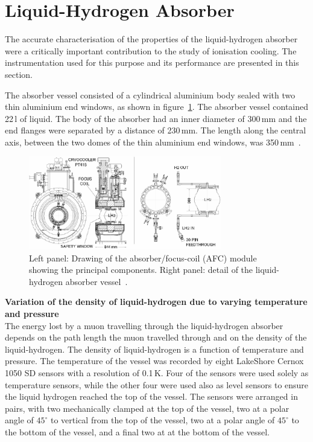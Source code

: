 \graphicspath{{07-Absorber/Figures/}}

\section{Liquid-Hydrogen Absorber}
\label{Sect:Absorber}

The accurate characterisation of the properties of the liquid-hydrogen
absorber were a critically important contribution to the study of
ionisation cooling.
The instrumentation used for this purpose and its performance are
presented in this section.

The absorber vessel consisted of a cylindrical aluminium body sealed
with two thin aluminium end windows, as shown in
figure~\ref{Fig:AbsorberVessel:Diag}.
The absorber vessel contained 22\,l of liquid.
The body of the absorber had an inner diameter of 300\,mm and the end
flanges were separated by a distance of 230\,mm.  
The length along the central axis, between the two domes of the thin
aluminium end windows, was 350\,mm~\cite{1748-0221-13-09-T09008}. \\
\begin{figure}
  \begin{center}
    \includegraphics[width=0.75\textwidth]{AFC-drwng.pdf}
  \end{center}
  \caption{
    Left panel: Drawing of the absorber/focus-coil (AFC) module
    showing the principal components.
    Right panel: detail of the liquid-hydrogen absorber vessel~\cite{1748-0221-13-09-T09008}.
  }
  \label{Fig:AbsorberVessel:Diag}
\end{figure}

\noindent\textbf{Variation of the density of liquid-hydrogen due to
    varying temperature and pressure} \\
\noindent
The energy lost by a muon travelling through the liquid-hydrogen
absorber depends on the path length the muon travelled through and on
the density of the liquid-hydrogen. The density of liquid-hydrogen is
a function of temperature and pressure.  
The temperature of the vessel was recorded by eight LakeShore Cernox
1050 SD sensors with a resolution of 0.1\,K. 
Four of the sensors were used solely as temperature sensors, while the
other four were used also as level sensors to ensure the
liquid hydrogen reached the top of the vessel. 
The sensors were arranged in pairs, with two mechanically clamped at
the top of the vessel, two at a polar angle of ${45}^{\circ}$ to
vertical from the top of the vessel, two at a polar angle of
${45}^{\circ}$ to the bottom of the vessel, and a
final two at at the bottom of the vessel. 

